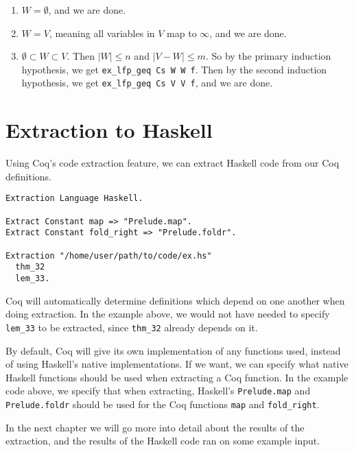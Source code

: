 \begin{enumerate}
  \item $W = \emptyset$, and we are done.
  \item $W = V$, meaning all variables in $V$ map to $\infty$, and we are done.
  \item $\emptyset \subset W \subset V$. Then $\lvert W \rvert \leq n$ and $\lvert V - W \rvert \leq m$.
      So by the primary induction hypothesis, we get \lstinline{ex_lfp_geq Cs W W f}.
      Then by the second induction hypothesis, we get \lstinline{ex_lfp_geq Cs V V f}, and we are done.
\end{enumerate}


\section{Extraction to Haskell}

Using Coq's code extraction feature, we can extract Haskell code from our Coq definitions.

\begin{minipage}{\linewidth}
\begin{lstlisting}[language=Coq, label={lst:extraction}, caption={Extraction of Coq definitions to Haskell}]
Extraction Language Haskell.

Extract Constant map => "Prelude.map".
Extract Constant fold_right => "Prelude.foldr".

Extraction "/home/user/path/to/code/ex.hs"
  thm_32
  lem_33.
\end{lstlisting}
\end{minipage}

Coq will automatically determine definitions which depend on one another when doing extraction.
In the example above, we would not have needed to specify \lstinline{lem_33} to be extracted,
since \lstinline{thm_32} already depends on it.

By default, Coq will give its own implementation of any functions used, instead of using
Haskell's native implementations. If we want, we can specify what native Haskell functions
should be used when extracting a Coq function. In the example code above,
we specify that when extracting, Haskell's \lstinline[language=Haskell]{Prelude.map} and \lstinline[language=Haskell]{Prelude.foldr}
should be used for the Coq functions \lstinline{map} and \lstinline{fold_right}.

In the next chapter we will go more into detail about the results of the extraction,
and the results of the Haskell code ran on some example input.
